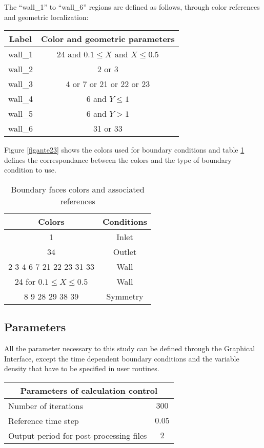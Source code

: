 The ``wall\_1'' to ``wall\_6'' regions are defined as follows, through color
references and geometric localization:
\begin{center}
\begin{tabular}{c|c}
Label & Color and geometric parameters \\
\hline
wall\_1 & 24 and $0.1\leqslant X$ and $X\leqslant 0.5$ \\
wall\_2 & 2 or 3 \\
wall\_3 & 4 or 7 or 21 or 22 or 23 \\
wall\_4 & 6 and $Y\leqslant1$ \\
wall\_5 & 6 and $Y>1$ \\
wall\_6 & 31 or 33 \\
\end{tabular}
\end{center}

Figure \ref{figante23} shows the colors used for boundary conditions and 
table \ref{tabante31} defines the correspondance between the colors and  
the type of boundary condition to use.

\begin{table}[htp]
\begin{center}
\begin{tabular}{|c|c|} 
\hline
Colors & Conditions \\
\hline
1 & Inlet \\
\hline
34 & Outlet \\
\hline
2 3 4 6 7 21 22 23 31 33 & Wall \\
\hline
24 for $0.1 \leq X \leq 0.5$ & Wall \\
\hline
8 9 28 29 38 39 & Symmetry \\
\hline
\end{tabular}
\caption{Boundary faces colors and associated references}
\label{tabante31}
\end{center}
\end{table}


	\subsection{Parameters}

All the parameter necessary to this study can be defined through the Graphical
Interface, except the time dependent boundary conditions and the variable
density that have to be specified in user routines.

\begin{center}
\begin{tabular}{|l|c|}
\hline
\multicolumn{2}{|c|}{Parameters of calculation control} \\
\hline
Number of iterations & $300$ \\
\hline
Reference time step & $0.05$ \\
\hline
Output period for post-processing files& $2$ \\
\hline
\end{tabular}\\
\end{center}

